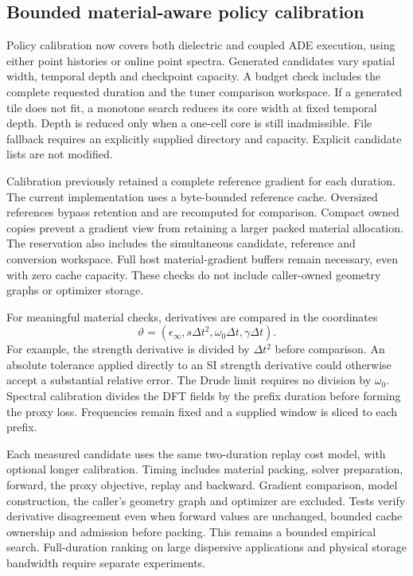 \documentclass[11pt,a4paper]{article}
\begin{document}
\subsection{Bounded material-aware policy calibration}
Policy calibration now covers both dielectric and coupled ADE execution,
using either point histories or online point spectra. Generated candidates
vary spatial width, temporal depth and checkpoint capacity. A budget check
includes the complete requested duration and the tuner comparison workspace.
If a generated tile does not fit, a monotone search reduces its core width
at fixed temporal depth. Depth is reduced only when a one-cell core is still
inadmissible. File fallback requires an explicitly supplied directory and
capacity. Explicit candidate lists are not modified.

Calibration previously retained a complete reference gradient for each
duration. The current implementation uses a byte-bounded reference cache.
Oversized references bypass retention and are recomputed for comparison.
Compact owned copies prevent a gradient view from retaining a larger packed
material allocation. The reservation also includes the simultaneous candidate,
reference and conversion workspace. Full host material-gradient buffers remain
necessary, even with zero cache capacity. These checks do not include
caller-owned geometry graphs or optimizer storage.

For meaningful material checks, derivatives are compared in the coordinates
\begin{equation}
 \vartheta=(\epsilon_\infty,s\Delta t^2,\omega_0\Delta t,\gamma\Delta t).
\end{equation}
For example, the strength derivative is divided by $\Delta t^2$ before
comparison. An absolute tolerance applied directly to an SI strength
derivative could otherwise accept a substantial relative error.
The Drude limit requires no division by $\omega_0$.
Spectral calibration divides the DFT fields by the prefix duration before
forming the proxy loss. Frequencies remain fixed and a supplied window is
sliced to each prefix.

Each measured candidate uses the same two-duration replay cost model, with
optional longer calibration. Timing includes material packing, solver
preparation, forward, the proxy objective, replay and backward. Gradient
comparison, model construction, the caller's geometry graph and optimizer
are excluded. Tests verify derivative disagreement even when forward values
are unchanged, bounded cache ownership and admission before packing.
This remains a bounded empirical search. Full-duration ranking on large
dispersive applications and physical storage bandwidth require separate experiments.
\end{document}
